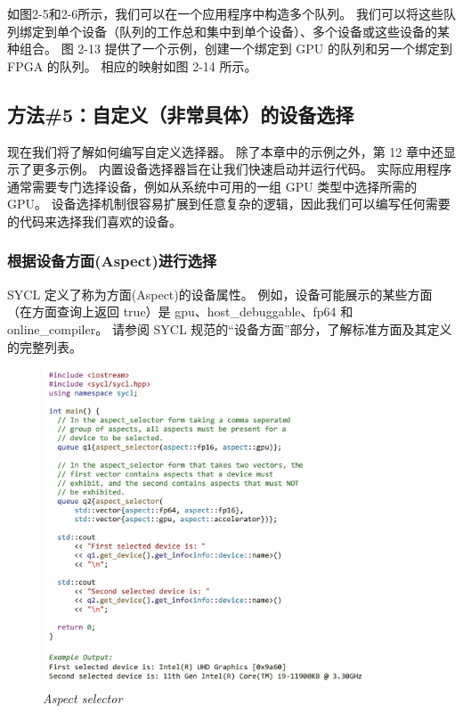 如图2-5和2-6所示，我们可以在一个应用程序中构造多个队列。 
我们可以将这些队列绑定到单个设备（队列的工作总和集中到单个设备）、多个设备或这些设备的某种组合。 
图 2-13 提供了一个示例，创建一个绑定到 GPU 的队列和另一个绑定到 FPGA 的队列。 相应的映射如图 2-14 所示。

\subsection{方法\#5：自定义（非常具体）的设备选择}
现在我们将了解如何编写自定义选择器。 除了本章中的示例之外，第 12 章中还显示了更多示例。
内置设备选择器旨在让我们快速启动并运行代码。 
实际应用程序通常需要专门选择设备，例如从系统中可用的一组 GPU 类型中选择所需的 GPU。 
设备选择机制很容易扩展到任意复杂的逻辑，因此我们可以编写任何需要的代码来选择我们喜欢的设备。

\subsubsection{根据设备方面(Aspect)进行选择}
SYCL 定义了称为方面(Aspect)的设备属性。 
例如，设备可能展示的某些方面（在方面查询上返回 true）是 gpu、host\_debuggable、fp64 和 online\_compiler。 
请参阅 SYCL 规范的“设备方面”部分，了解标准方面及其定义的完整列表。

\begin{figure}[H]
	\centering
	\includegraphics[width=0.9\textwidth]{figs/F2.15.png}
	\caption{\textit{Aspect selector}}
\end{figure}

